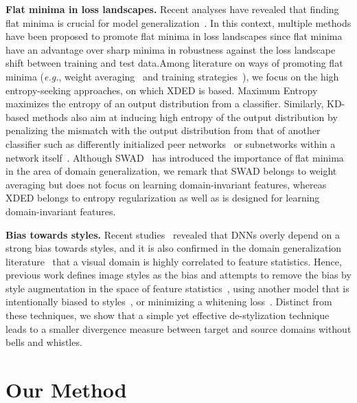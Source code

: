 \documentclass[runningheads]{llncs}
\def\eg{\emph{e.g.}}
\begin{document}
\noindent \textbf{Flat minima in loss landscapes.}
Recent analyses have revealed that finding flat minima is crucial for model generalization~\cite{keskar2016large,dziugaite2017computing,foret2021sharpness}. 
In this context,
multiple methods have been proposed to promote flat minima in loss landscapes since flat minima have an advantage over sharp minima in robustness against the loss landscape shift between training and test data.Among literature on ways of promoting flat minima (\eg, weight averaging~\cite{izmailov2018averaging,cha2021swad} and training strategies~\cite{foret2021sharpness,chaudhari2017entropy}), we focus on the high entropy-seeking approaches, on which XDED is based. 
Maximum Entropy~\cite{pereyra2017regularizing,cha2020cpr} maximizes the entropy of an output distribution from a classifier.
Similarly, KD-based methods also aim at inducing high entropy of the output distribution by penalizing the mismatch with the output distribution from that of another classifier such as differently initialized peer networks~\cite{zhang2018deep} or subnetworks within a network itself~\cite{zhang2019your}. Although SWAD~\cite{cha2021swad} has introduced the importance of flat minima in the area of domain generalization, we remark that SWAD belongs to weight averaging but does not focus on learning domain-invariant features, whereas XDED belongs to entropy regularization as well as is designed for learning domain-invariant features.



\noindent \textbf{Bias towards styles.}
Recent studies~\cite{brendel2019approximating,geirhos2018imagenet} revealed that DNNs overly depend on a strong bias towards styles, and it is also confirmed in the domain generalization literature~\cite{choi2021robustnet,zhou2021domain,StyleNeophile} that a visual domain is highly correlated to feature statistics.
Hence, previous work defines image styles as the bias and attempts to remove the bias by style augmentation in the space of feature statistics~\cite{zhou2021domain,StyleNeophile}, using another model that is intentionally biased to styles~\cite{nam2021reducing}, or minimizing a whitening loss~\cite{choi2021robustnet}.
Distinct from these techniques, we show that a simple yet effective de-stylization technique leads to a smaller divergence measure between target and source domains without bells and whistles.

 \section{Our Method}
\label{method}
\end{document}
